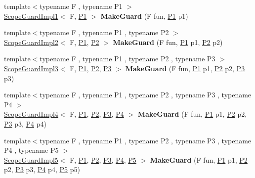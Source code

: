 \begin{DoxyCompactItemize}
\item 
\hypertarget{namespaceLoki_a9add70eb6c3883f6c257a2fa99a43018}{}{\footnotesize template$<$typename F , typename P1 $>$ }\\\hyperlink{classLoki_1_1ScopeGuardImpl1}{Scope\+Guard\+Impl1}$<$ F, \hyperlink{structP1}{P1} $>$ {\bfseries Make\+Guard} (F fun, \hyperlink{structP1}{P1} p1)\label{namespaceLoki_a9add70eb6c3883f6c257a2fa99a43018}

\item 
\hypertarget{namespaceLoki_a110ab382ed01463af71e7b21cdd3b23f}{}{\footnotesize template$<$typename F , typename P1 , typename P2 $>$ }\\\hyperlink{classLoki_1_1ScopeGuardImpl2}{Scope\+Guard\+Impl2}$<$ F, \hyperlink{structP1}{P1}, \hyperlink{structP2}{P2} $>$ {\bfseries Make\+Guard} (F fun, \hyperlink{structP1}{P1} p1, \hyperlink{structP2}{P2} p2)\label{namespaceLoki_a110ab382ed01463af71e7b21cdd3b23f}

\item 
\hypertarget{namespaceLoki_af189952643483caeb18806b1d0f3f06e}{}{\footnotesize template$<$typename F , typename P1 , typename P2 , typename P3 $>$ }\\\hyperlink{classLoki_1_1ScopeGuardImpl3}{Scope\+Guard\+Impl3}$<$ F, \hyperlink{structP1}{P1}, \hyperlink{structP2}{P2}, \hyperlink{structP3}{P3} $>$ {\bfseries Make\+Guard} (F fun, \hyperlink{structP1}{P1} p1, \hyperlink{structP2}{P2} p2, \hyperlink{structP3}{P3} p3)\label{namespaceLoki_af189952643483caeb18806b1d0f3f06e}

\item 
\hypertarget{namespaceLoki_a4241fafa5c20fb65e5bb79ce298cf787}{}{\footnotesize template$<$typename F , typename P1 , typename P2 , typename P3 , typename P4 $>$ }\\\hyperlink{classLoki_1_1ScopeGuardImpl4}{Scope\+Guard\+Impl4}$<$ F, \hyperlink{structP1}{P1}, \hyperlink{structP2}{P2}, \hyperlink{structP3}{P3}, \hyperlink{structP4}{P4} $>$ {\bfseries Make\+Guard} (F fun, \hyperlink{structP1}{P1} p1, \hyperlink{structP2}{P2} p2, \hyperlink{structP3}{P3} p3, \hyperlink{structP4}{P4} p4)\label{namespaceLoki_a4241fafa5c20fb65e5bb79ce298cf787}

\item 
\hypertarget{namespaceLoki_aee04e910434e3d629f5e5ec10e830a4e}{}{\footnotesize template$<$typename F , typename P1 , typename P2 , typename P3 , typename P4 , typename P5 $>$ }\\\hyperlink{classLoki_1_1ScopeGuardImpl5}{Scope\+Guard\+Impl5}$<$ F, \hyperlink{structP1}{P1}, \hyperlink{structP2}{P2}, \hyperlink{structP3}{P3}, \hyperlink{structP4}{P4}, \hyperlink{structP5}{P5} $>$ {\bfseries Make\+Guard} (F fun, \hyperlink{structP1}{P1} p1, \hyperlink{structP2}{P2} p2, \hyperlink{structP3}{P3} p3, \hyperlink{structP4}{P4} p4, \hyperlink{structP5}{P5} p5)\label{namespaceLoki_aee04e910434e3d629f5e5ec10e830a4e}


\end{DoxyCompactItemize}
